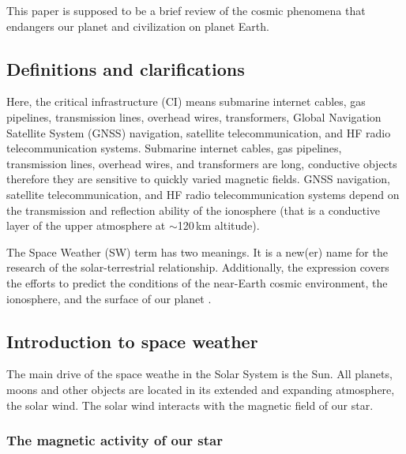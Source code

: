 \documentclass[sn-aps]{sn-jnl}%
\begin{document}
This paper is supposed to be a brief review of the cosmic phenomena that endangers our planet and civilization on planet Earth. 

\subsection{Definitions and clarifications}
\label{sec:def}

Here, the critical infrastructure (CI) means submarine internet cables, gas pipelines, transmission lines, overhead wires, transformers, Global Navigation Satellite System (GNSS) navigation, satellite telecommunication, and HF radio telecommunication systems. Submarine internet cables, gas pipelines, transmission lines, overhead wires, and transformers are long, conductive objects therefore they are sensitive to quickly varied magnetic fields. GNSS navigation, satellite telecommunication, and HF radio telecommunication systems depend on the transmission and reflection ability of the ionosphere (that is a conductive layer of the upper atmosphere at $\sim$120\,km altitude).

The Space Weather (SW) term has two meanings. It is a new(er) name for the research of the solar-terrestrial relationship. Additionally, the expression covers the efforts to predict the conditions of the near-Earth cosmic environment, the ionosphere, and the surface of our planet \cite{scherer05:_space_weath}. 


\subsection{Introduction to space weather}
\label{sec:swintro}

The main drive of the space weathe in the Solar System is the Sun. All planets, moons and other objects are located in its extended and expanding atmosphere, the solar wind. The solar wind interacts with the magnetic field of our star.

\subsubsection{The magnetic activity of our star}
\label{sec:magnact}
\end{document}
